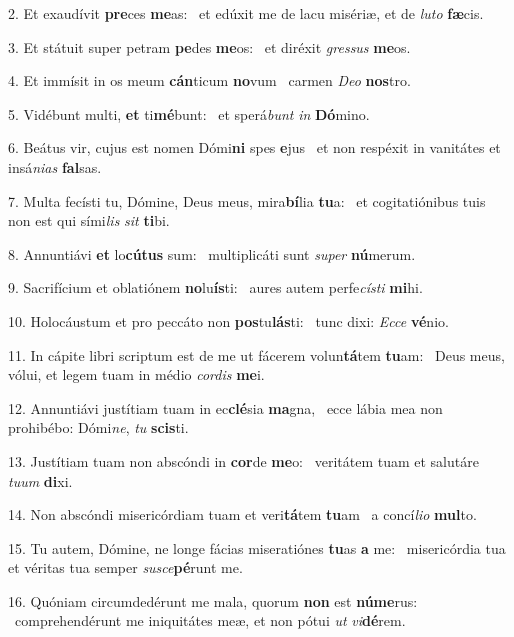 2. Et exaudívit \textbf{pre}ces \textbf{me}as: \ast\  et edúxit me de lacu misériæ, et de \textit{lu}\textit{to} \textbf{fæ}cis.\

3. Et státuit super petram \textbf{pe}des \textbf{me}os: \ast\  et diréxit \textit{gres}\textit{sus} \textbf{me}os.\

4. Et immísit in os meum \textbf{cán}ticum \textbf{no}vum \ast\  carmen \textit{De}\textit{o} \textbf{nos}tro.\

5. Vidébunt multi, \textbf{et} ti\textbf{mé}bunt: \ast\  et sperá\textit{bunt} \textit{in} \textbf{Dó}mino.\

6. Beátus vir, cujus est nomen Dómi\textbf{ni} spes \textbf{e}jus \ast\  et non respéxit in vanitátes et insá\textit{ni}\textit{as} \textbf{fal}sas.\

7. Multa fecísti tu, Dómine, Deus meus, mira\textbf{bí}lia \textbf{tu}a: \ast\  et cogitatiónibus tuis non est qui sími\textit{lis} \textit{sit} \textbf{ti}bi.\

8. Annuntiávi \textbf{et} lo\textbf{cú}\textbf{tus} sum: \ast\  multiplicáti sunt \textit{su}\textit{per} \textbf{nú}merum.\

9. Sacrifícium et oblatiónem \textbf{no}lu\textbf{ís}ti: \ast\  aures autem perfe\textit{cís}\textit{ti} \textbf{mi}hi.\

10. Holocáustum et pro peccáto non \textbf{pos}tu\textbf{lás}ti: \ast\  tunc dixi: \textit{Ec}\textit{ce} \textbf{vé}nio.\

11. In cápite libri scriptum est de me ut fácerem volun\textbf{tá}tem \textbf{tu}am: \ast\  Deus meus, vólui, et legem tuam in médio \textit{cor}\textit{dis} \textbf{me}i.\

12. Annuntiávi justítiam tuam in ec\textbf{clé}sia \textbf{ma}gna, \ast\  ecce lábia mea non prohibébo: Dómi\textit{ne}, \textit{tu} \textbf{scis}ti.\

13. Justítiam tuam non abscóndi in \textbf{cor}de \textbf{me}o: \ast\  veritátem tuam et salutáre \textit{tu}\textit{um} \textbf{di}xi.\

14. Non abscóndi misericórdiam tuam et veri\textbf{tá}tem \textbf{tu}am \ast\  a concí\textit{li}\textit{o} \textbf{mul}to.\

15. Tu autem, Dómine, ne longe fácias miseratiónes \textbf{tu}as \textbf{a} me: \ast\  misericórdia tua et véritas tua semper \textit{su}\textit{sce}\textbf{pé}runt me.\

16. Quóniam circumdedérunt me mala, quorum \textbf{non} est \textbf{nú}\textbf{me}rus: \ast\  comprehendérunt me iniquitátes meæ, et non pótui \textit{ut} \textit{vi}\textbf{dé}rem.\

